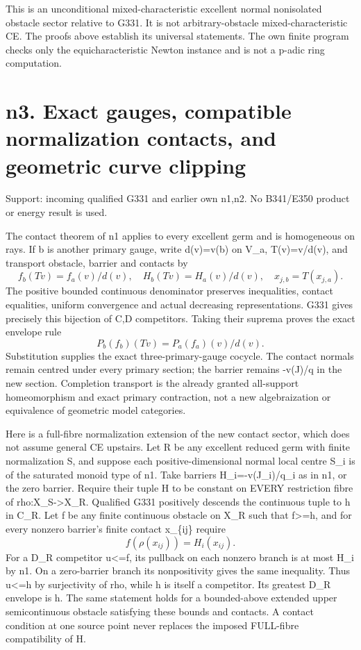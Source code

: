 \documentclass[11pt]{article}
\begin{document}
This is an unconditional mixed-characteristic excellent normal nonisolated obstacle sector relative to G331. It is not arbitrary-obstacle mixed-characteristic CE. The proofs above establish its universal statements. The own finite program checks only the equicharacteristic Newton instance and is not a p-adic ring computation.


\section{n3. Exact gauges, compatible normalization contacts, and geometric curve clipping}

Support: incoming qualified G331 and earlier own n1,n2. No B341/E350 product or energy result is used.

The contact theorem of n1 applies to every excellent germ and is homogeneous on rays. If b is another primary gauge, write d(v)=v(b) on V\_a, T(v)=v/d(v), and transport obstacle, barrier and contacts by
\[
 f_b(Tv)=f_a(v)/d(v),\quad H_b(Tv)=H_a(v)/d(v),\quad x_{j,b}=T(x_{j,a}).
\]
The positive bounded continuous denominator preserves inequalities, contact equalities, uniform convergence and actual decreasing representations. G331 gives precisely this bijection of C,D competitors. Taking their suprema proves the exact envelope rule
\[
 P_b(f_b)(Tv)=P_a(f_a)(v)/d(v).
\]
Substitution supplies the exact three-primary-gauge cocycle. The contact normals remain centred under every primary section; the barrier remains -v(J)/q in the new section. Completion transport is the already granted all-support homeomorphism and exact primary contraction, not a new algebraization or equivalence of geometric model categories.

Here is a full-fibre normalization extension of the new contact sector, which does not assume general CE upstairs. Let R be any excellent reduced germ with finite normalization S, and suppose each positive-dimensional normal local centre S\_i is of the saturated monoid type of n1. Take barriers H\_i=-v(J\_i)/q\_i as in n1, or the zero barrier. Require their tuple H to be constant on EVERY restriction fibre of rho:X\_S->X\_R. Qualified G331 positively descends the continuous tuple to h in C\_R. Let f be any finite continuous obstacle on X\_R such that f>=h, and for every nonzero barrier's finite contact x\_\{ij\} require
\[
 f(\rho(x_{ij}))=H_i(x_{ij}).
\]
For a D\_R competitor u<=f, its pullback on each nonzero branch is at most H\_i by n1. On a zero-barrier branch its nonpositivity gives the same inequality. Thus u<=h by surjectivity of rho, while h is itself a competitor. Its greatest D\_R envelope is h. The same statement holds for a bounded-above extended upper semicontinuous obstacle satisfying these bounds and contacts. A contact condition at one source point never replaces the imposed FULL-fibre compatibility of H.
\end{document}
